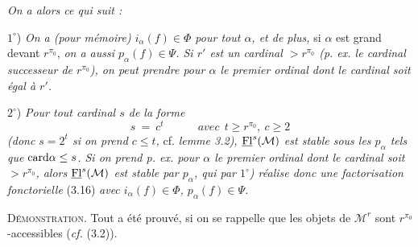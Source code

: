 \textit{On a alors ce qui suit :}

$1^\circ$) \textit{On a (pour mémoire) $i_\alpha(f)\in\Phi$ pour tout $\alpha$, et de plus,} si $\alpha$ est grand devant $r^{\pi_0}$, \textit{on a aussi $p_\alpha(f)\in\Psi$. Si $r'$ est un cardinal $>r^{\pi_0}$ (p. ex. le cardinal successeur de $r^{\pi_0}$), on peut prendre pour $\alpha$ le premier ordinal dont le cardinal soit égal à $r'$.}

$2^\circ$) \textit{Pour tout cardinal $s$ de la forme}
\[
s\ =\ c^t\qquad\quad\textit{avec}\ \ t\geq r^{\pi_0},\ c\geq 2
\]
\textit{(donc $s=2^t$ si on prend $c\leq t$,} cf. \textit{lemme 3.2), $\underline{\mathrm{Fl}}^s(\mathcal{M})$ est stable sous les $p_\alpha$ tels que} $\mathrm{card}\alpha\leq s$\textit{. Si on prend p. ex. pour $\alpha$ le premier ordinal dont le cardinal soit $>r^{\pi_0}$, alors $\underline{\mathrm{Fl}}^s(\mathcal{M})$ est stable par $p_\alpha$, qui par $1^\circ$) réalise donc une factorisation fonctorielle} \textup{(3.16)} \textit{avec $i_\alpha(f)\in\Phi$, $p_\alpha(f)\in\Psi$.}


\textsc{Démonstration}. Tout a été prouvé, si on se rappelle que les objets de $\mathcal{M}^r$ sont $r^{\pi_0}$-accessibles (\textit{cf.} (3.2)).


